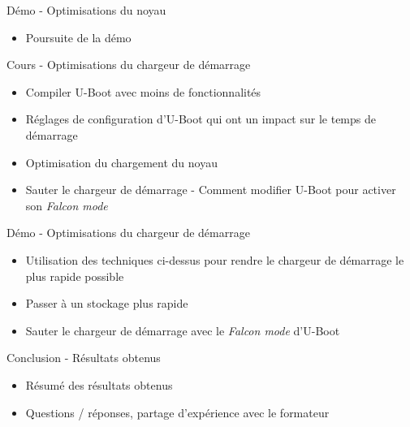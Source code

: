 \documentclass[a4paper,12pt,obeyspaces,spaces,hyphens]{article}
\begin{document}
\feagendaonecolumn
{Démo - Optimisations du noyau}
{
 \begin{itemize}
 \item Poursuite de la démo
 \end{itemize}
}

\feagendatwocolumn
{Cours - Optimisations du chargeur de démarrage}
{
  \begin{itemize}
  \item Compiler U-Boot avec moins de fonctionnalités
  \item Réglages de configuration d'U-Boot qui ont un impact
        sur le temps de démarrage
  \item Optimisation du chargement du noyau
  \item Sauter le chargeur de démarrage - Comment modifier U-Boot pour
	activer son {\em Falcon mode}
  \end{itemize}
}
{Démo - Optimisations du chargeur de démarrage}
{
 \begin{itemize}
 \item Utilisation des techniques ci-dessus pour rendre le chargeur
       de démarrage le plus rapide possible
 \item Passer à un stockage plus rapide
 \item Sauter le chargeur de démarrage avec le {\em Falcon mode} d'U-Boot
 \end{itemize}
}

\feagendaonecolumn
{Conclusion - Résultats obtenus}
{
 \begin{itemize}
 \item Résumé des résultats obtenus
 \item Questions / réponses, partage d'expérience avec le formateur
 \end{itemize}
}
\end{document}
